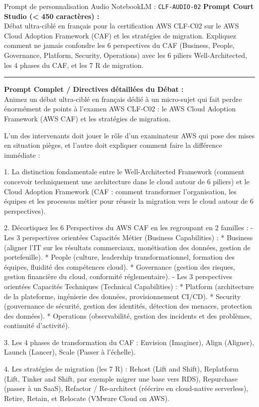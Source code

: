 \documentclass[11pt,a4paper]{article}
\begin{document}
\begin{promptbox}{Prompt de personnalisation Audio NotebookLM : \texttt{CLF-AUDIO-02}}
\textbf{Prompt Court Studio (< 450 caractères) :}\\
Débat ultra-ciblé en français pour la certification AWS CLF-C02 sur le AWS Cloud Adoption Framework (CAF) et les stratégies de migration. Expliquez comment ne jamais confondre les 6 perspectives du CAF (Business, People, Governance, Platform, Security, Operations) avec les 6 piliers Well-Architected, les 4 phases du CAF, et les 7 R de migration.

\medskip\hrule\medskip
\textbf{Prompt Complet / Directives détaillées du Débat :}\\
Animez un débat ultra-ciblé en français dédié à un micro-sujet qui fait perdre énormément de points à l'examen AWS CLF-C02 : le AWS Cloud Adoption Framework (AWS CAF) et les stratégies de migration.

L'un des intervenants doit jouer le rôle d'un examinateur AWS qui pose des mises en situation pièges, et l'autre doit expliquer comment faire la différence immédiate :

1. La distinction fondamentale entre le Well-Architected Framework (comment concevoir techniquement une architecture dans le cloud autour de 6 piliers) et le Cloud Adoption Framework (CAF : comment transformer l'organisation, les équipes et les processus métier pour réussir la migration vers le cloud autour de 6 perspectives).

2. Décortiquez les 6 Perspectives du AWS CAF en les regroupant en 2 familles :
- Les 3 perspectives orientées Capacités Métier (Business Capabilities) :
  * Business (aligner l'IT sur les résultats commerciaux, monétisation des données, gestion de portefeuille).
  * People (culture, leadership transformationnel, formation des équipes, fluidité des compétences cloud).
  * Governance (gestion des risques, gestion financière du cloud, conformité réglementaire).
- Les 3 perspectives orientées Capacités Techniques (Technical Capabilities) :
  * Platform (architecture de la plateforme, ingénierie des données, provisionnement CI/CD).
  * Security (gouvernance de sécurité, gestion des identités, détection des menaces, protection des données).
  * Operations (observabilité, gestion des incidents et des problèmes, continuité d'activité).

3. Les 4 phases de transformation du CAF : Envision (Imaginer), Align (Aligner), Launch (Lancer), Scale (Passer à l'échelle).

4. Les stratégies de migration (les 7 R) : Rehost (Lift and Shift), Replatform (Lift, Tinker and Shift, par exemple migrer une base vers RDS), Repurchase (passer à un SaaS), Refactor / Re-architect (réécrire en cloud-native serverless), Retire, Retain, et Relocate (VMware Cloud on AWS).
\end{promptbox}
\end{document}
